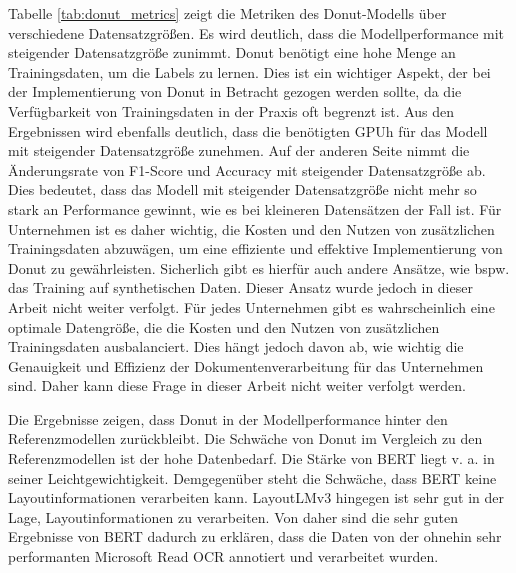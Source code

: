 Tabelle \ref{tab:donut_metrics} zeigt die Metriken des Donut-Modells über verschiedene Datensatzgrößen. Es wird deutlich, dass die Modellperformance mit steigender Datensatzgröße zunimmt. Donut benötigt eine hohe Menge an Trainingsdaten, um die Labels zu lernen. Dies ist ein wichtiger Aspekt, der bei der Implementierung von Donut in Betracht gezogen werden sollte, da die Verfügbarkeit von Trainingsdaten in der Praxis oft begrenzt ist. Aus den Ergebnissen wird ebenfalls deutlich, dass die benötigten GPUh für das Modell mit steigender Datensatzgröße zunehmen. Auf der anderen Seite nimmt die Änderungsrate von F1-Score und Accuracy mit steigender Datensatzgröße ab. Dies bedeutet, dass das Modell mit steigender Datensatzgröße nicht mehr so stark an Performance gewinnt, wie es bei kleineren Datensätzen der Fall ist. Für Unternehmen ist es daher wichtig, die Kosten und den Nutzen von zusätzlichen Trainingsdaten abzuwägen, um eine effiziente und effektive Implementierung von Donut zu gewährleisten. Sicherlich gibt es hierfür auch andere Ansätze, wie bspw. das Training auf synthetischen Daten. Dieser Ansatz wurde jedoch in dieser Arbeit nicht weiter verfolgt. Für jedes Unternehmen gibt es wahrscheinlich eine optimale Datengröße, die die Kosten und den Nutzen von zusätzlichen Trainingsdaten ausbalanciert. Dies hängt jedoch davon ab, wie wichtig die Genauigkeit und Effizienz der Dokumentenverarbeitung für das Unternehmen sind. Daher kann diese Frage in dieser Arbeit nicht weiter verfolgt werden.

Die Ergebnisse zeigen, dass Donut in der Modellperformance hinter den Referenzmodellen zurückbleibt. Die Schwäche von Donut im Vergleich zu den Referenzmodellen ist der hohe Datenbedarf. Die Stärke von BERT liegt v. a. in seiner Leichtgewichtigkeit. Demgegenüber steht die Schwäche, dass BERT keine Layoutinformationen verarbeiten kann. LayoutLMv3 hingegen ist sehr gut in der Lage, Layoutinformationen zu verarbeiten. Von daher sind die sehr guten Ergebnisse von BERT dadurch zu erklären, dass die Daten von der ohnehin sehr performanten Microsoft Read OCR annotiert und verarbeitet wurden. 

\pgfplotsset{width=10cm,compat=1.9}

